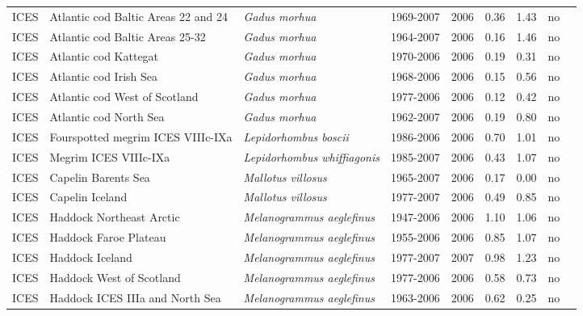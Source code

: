 \begin{longtable}{p{1.8cm}p{4cm}p{4cm}ccccp{1.9cm}c}
  ICES & Atlantic cod Baltic Areas 22 and 24 & \textit{Gadus morhua} & 1969-2007 & 2006 & 0.36 & 1.43 & no & \cite{ICES-WGBFAS-2007.pdf} \\ 
  ICES & Atlantic cod Baltic Areas 25-32 & \textit{Gadus morhua} & 1964-2007 & 2006 & 0.16 & 1.46 & no & \cite{ICES-WGBFAS-2007.pdf} \\ 
  ICES & Atlantic cod Kattegat & \textit{Gadus morhua} & 1970-2006 & 2006 & 0.19 & 0.31 & no & \cite{ICES-WGBFAS-2007.pdf} \\ 
  ICES & Atlantic cod Irish Sea & \textit{Gadus morhua} & 1968-2006 & 2006 & 0.15 & 0.56 & no & \cite{ICES-WGNSDS-2007.pdf} \\ 
  ICES & Atlantic cod West of Scotland & \textit{Gadus morhua} & 1977-2006 & 2006 & 0.12 & 0.42 & no & \cite{ICES-WGNSDS-2007.pdf} \\ 
  ICES & Atlantic cod North Sea & \textit{Gadus morhua} & 1962-2007 & 2006 & 0.19 & 0.80 & no & \cite{ICES-WGNSSK-2007.pdf} \\ 
  ICES & Fourspotted megrim ICES VIIIc-IXa & \textit{Lepidorhombus boscii} & 1986-2006 & 2006 & 0.70 & 1.01 & no & \cite{ICES-WGHMM-2007.pdf} \\ 
  ICES & Megrim ICES VIIIc-IXa & \textit{Lepidorhombus whiffiagonis} & 1985-2007 & 2006 & 0.43 & 1.07 & no & \cite{ICES-WGHMM-2007.pdf} \\ 
  ICES & Capelin Barents Sea & \textit{Mallotus villosus} & 1965-2007 & 2006 & 0.17 & 0.00 & no & \cite{ICES-AFWG-2007.pdf} \\ 
  ICES & Capelin Iceland & \textit{Mallotus villosus} & 1977-2007 & 2006 & 0.49 & 0.85 & no & \cite{ICES-NWWG-2007.pdf} \\ 
  ICES & Haddock Northeast Arctic & \textit{Melanogrammus aeglefinus} & 1947-2006 & 2006 & 1.10 & 1.06 & no & \cite{ICES-AFWG-2007.pdf} \\ 
  ICES & Haddock Faroe Plateau & \textit{Melanogrammus aeglefinus} & 1955-2006 & 2006 & 0.85 & 1.07 & no & \cite{ICES-NWWG-2007.pdf} \\ 
  ICES & Haddock Iceland & \textit{Melanogrammus aeglefinus} & 1977-2007 & 2007 & 0.98 & 1.23 & no & \cite{ICES-NWWG-2007.pdf} \\ 
  ICES & Haddock West of Scotland & \textit{Melanogrammus aeglefinus} & 1977-2006 & 2006 & 0.58 & 0.73 & no & \cite{ICES-WGNSDS-2007.pdf} \\ 
  ICES & Haddock ICES IIIa and North Sea & \textit{Melanogrammus aeglefinus} & 1963-2006 & 2006 & 0.62 & 0.25 & no & \cite{ICES-WGNSSK-2007.pdf} \\ 

\end{longtable}
